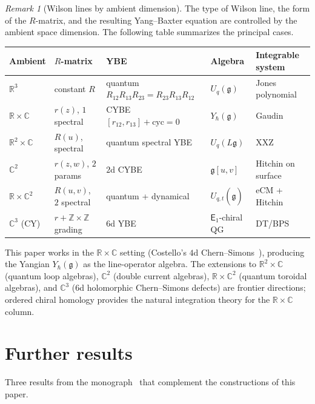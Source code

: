 \documentclass[11pt,reqno]{amsart}
\theoremstyle{definition}
\theoremstyle{remark}
\newtheorem{remark}[theorem]{Remark}
\newcommand{\Eone}{\mathsf{E}_{1}}
\newcommand{\fg}{\mathfrak{g}}
\newcommand{\CC}{\mathbb{C}}
\newcommand{\RR}{\mathbb{R}}
\newcommand{\ZZ}{\mathbb{Z}}
\numberwithin{equation}{section}
\begin{document}
\begin{remark}[Wilson lines by ambient dimension]
\label{rem:wilson-line-classification}
The type of Wilson line, the form of the $R$-matrix, and
the resulting Yang--Baxter equation are controlled by the
ambient space dimension. The following table summarizes the
principal cases.

\begin{center}
\renewcommand{\arraystretch}{1.25}
\small
\begin{tabular}{@{} l l l l l @{}}
\toprule
Ambient & $R$-matrix & YBE & Algebra & Integrable system \\
\midrule
$\RR^3$ & constant $R$ & quantum $R_{12}R_{13}R_{23} = R_{23}R_{13}R_{12}$
  & $U_q(\fg)$ & Jones polynomial \\
$\RR \times \CC$ & $r(z)$, $1$ spectral & CYBE $[r_{12},r_{13}] + \mathrm{cyc} = 0$
  & $Y_\hbar(\fg)$ & Gaudin \\
$\RR^2 \times \CC$ & $R(u)$, spectral & quantum spectral YBE
  & $U_q(L\fg)$ & XXZ \\
$\CC^2$ & $r(z,w)$, $2$ params & $2$d CYBE
  & $\fg[u,v]$ & Hitchin on surface \\
$\RR \times \CC^2$ & $R(u,v)$, $2$ spectral & quantum + dynamical
  & $U_{q,t}(\widehat{\widehat{\fg}})$ & eCM + Hitchin \\
$\CC^3$ (CY) & $r + \ZZ \times \ZZ$ grading & $6$d YBE
  & $\Eone$-chiral QG & DT/BPS \\
\bottomrule
\end{tabular}
\end{center}

\noindent
This paper works in the $\RR \times \CC$ setting
(Costello's $4$d Chern--Simons~\cite{CWY1,CWY2,CFG26,CG17}),
producing the Yangian $Y_\hbar(\fg)$ as the
line-operator algebra.
The extensions to $\RR^2 \times \CC$ (quantum loop
algebras), $\CC^2$ (double current algebras),
$\RR \times \CC^2$ (quantum toroidal algebras), and
$\CC^3$ ($6$d holomorphic Chern--Simons defects) are
frontier directions; ordered chiral homology provides
the natural integration theory for the
$\RR \times \CC$ column.
\end{remark}


\section{Further results}
\label{sec:further-results}

Three results from the monograph~\cite{Lorgat26I} that
complement the constructions of this paper.
\end{document}
